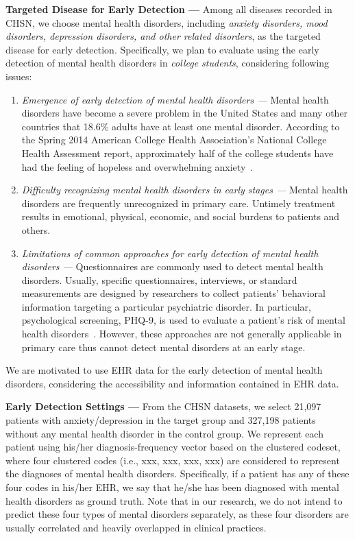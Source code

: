 \textbf{Targeted Disease for Early Detection --- } Among all diseases recorded in CHSN, we choose mental health disorders, including \emph{anxiety disorders, mood disorders, depression disorders, and other related disorders}, as the targeted disease for early detection. Specifically, we plan to evaluate \TheName{} using the early detection of mental health disorders in \emph{college students}, considering following issues:
\begin{enumerate}
\item  \emph{Emergence of early detection of mental health disorders --- } Mental health disorders have become a severe problem in the United States and many other countries that 18.6\% adults have at least one mental disorder. 
According to the Spring 2014 American College Health Association's National College Health Assessment report, approximately half of the college students have had the feeling of hopeless and overwhelming anxiety~\cite{ACHA2014}. 

\item  \emph{Difficulty recognizing mental health disorders in early stages --- } Mental health disorders are frequently unrecognized  in primary care. 
Untimely treatment results in emotional, physical, economic, and social burdens to patients and others. 

\item \emph{Limitations of common approaches for early detection of mental health disorders --- } Questionnaires are commonly used to detect mental health disorders. 
    Usually, specific questionnaires, interviews, or standard measurements are designed by researchers to collect patients' behavioral information targeting a particular psychiatric disorder. 
    In particular, psychological screening, PHQ-9, is used to evaluate a patient's risk of mental health disorders~\cite{kroenke2002phq}. However, these approaches are not generally applicable in primary care thus cannot detect mental disorders at an early stage. 

\end{enumerate}
%
We are motivated to use EHR data for the early detection of mental health disorders, considering the accessibility and information contained in EHR data. 

\textbf{Early Detection Settings --- } From the CHSN datasets, we select 21,097 patients with anxiety/depression in the target group and 327,198 patients without any mental health disorder in the control group. 
We represent each patient using his/her diagnosis-frequency vector based on the clustered codeset, where four clustered codes (i.e., xxx, xxx, xxx, xxx) are considered to represent the diagnoses of mental health disorders. 
Specifically, if a patient has any of these four codes in his/her EHR, we say that he/she has been diagnosed with mental health disorders as ground truth.
Note that in our research, we do not intend to predict these four types of mental disorders separately, as these four disorders are usually correlated and heavily overlapped in clinical practices.


